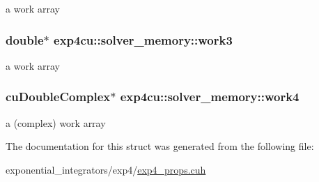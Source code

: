 a work array 

\subsubsection[{\texorpdfstring{work3}{work3}}]{\setlength{\rightskip}{0pt plus 5cm}double$\ast$ exp4cu\+::solver\+\_\+memory\+::work3}\hypertarget{structexp4cu_1_1solver__memory_a1798b2513a1d21e9beaa998f1dc1df89}{}\label{structexp4cu_1_1solver__memory_a1798b2513a1d21e9beaa998f1dc1df89}


a work array 

\subsubsection[{\texorpdfstring{work4}{work4}}]{\setlength{\rightskip}{0pt plus 5cm}cu\+Double\+Complex$\ast$ exp4cu\+::solver\+\_\+memory\+::work4}\hypertarget{structexp4cu_1_1solver__memory_a8b2943ea29259b541a9143409bc8317d}{}\label{structexp4cu_1_1solver__memory_a8b2943ea29259b541a9143409bc8317d}


a (complex) work array 



The documentation for this struct was generated from the following file\+:\begin{DoxyCompactItemize}
\item 
exponential\+\_\+integrators/exp4/\hyperlink{exp4__props_8cuh}{exp4\+\_\+props.\+cuh}\end{DoxyCompactItemize}

